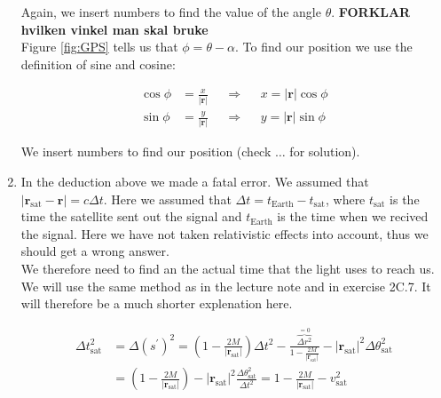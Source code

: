 \documentclass[a4paper,10pt,english]{article}
\begin{document}
\begin{enumerate}
Again, we insert numbers to find the value of the angle $\theta$. \textbf{FORKLAR hvilken vinkel man skal bruke}
\\
Figure \ref{fig:GPS} tells us that $\phi=\theta-\alpha$. To find our position we use the definition of sine and cosine:

\begin{align*}
\cos{\phi}&=\frac{x}{|\textbf{r}|} &&\Rightarrow&& x=|\textbf{r}|\cos{\phi}\\
\sin{\phi}&=\frac{y}{|\textbf{r}|} &&\Rightarrow&& y=|\textbf{r}|\sin{\phi}
\end{align*}

We insert numbers to find our position (check $\ldots$ for solution).

\item In the deduction above we made a fatal error. We assumed that $|\textbf{r}_{\text{sat}}-\textbf{r}|=c\Delta t$. Here we assumed that $\Delta t=t_{\text{Earth}}-t_{\text{sat}}$, where $t_{\text{sat}}$ is the time the satellite sent out the signal and $t_{\text{Earth}}$ is the time when we recived the signal. Here we have not taken relativistic effects into account, thus we should get a wrong answer.
\\
We therefore need to find an the actual time that the light uses to reach us. We will use the same method as in the lecture note and in exercise 2C.7. It will therefore be a much shorter explenation here.

\begin{align*}
\Delta t_{\text{sat}}^{2}&=\Delta (s^{\prime})^{2}=\left(1-\frac{2M}{|\textbf{r}_{\text{sat}}|}\right)\Delta t^{2}-\frac{\overbrace{\Delta r^{2}}^{=0}}{1-\frac{2M}{|\textbf{r}_{\text{sat}}|}}-|\textbf{r}_{\text{sat}}|^{2}\Delta\theta^{2}_{\text{sat}}\\
&=\left(1-\frac{2M}{|\textbf{r}_{\text{sat}}|}\right)-|\textbf{r}_{\text{sat}}|^{2}\frac{\Delta\theta^{2}_{\text{sat}}}{\Delta t^{2}}=1-\frac{2M}{|\textbf{r}_{\text{sat}}|}-v_{\text{sat}}^{2}
\end{align*}


\end{enumerate}
\end{document}

